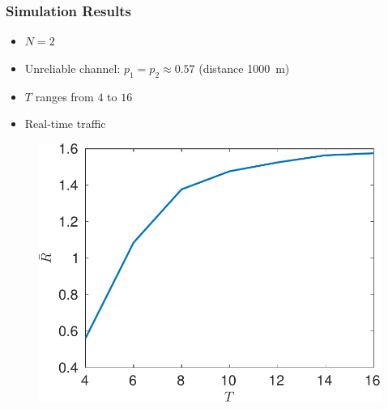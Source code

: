 \documentclass{beamer}
\begin{document}
\begin{frame}
\frametitle{Simulation Results}
\begin{itemize}
\item $N=2$
\item Unreliable channel: $p_1 = p_2 \approx 0.57$ (distance \SI{1000}{m})
\item $T$ ranges from $4$ to $16$
\item Real-time traffic
\end{itemize}
\begin{figure}[htbp]
  \centering
  \includegraphics[height=.5\textheight]{realtime_throughput_T.pdf}
\end{figure}
\end{frame}
\end{document}
